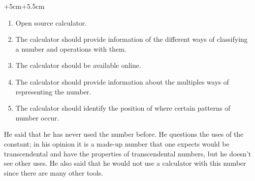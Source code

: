 \documentclass[../main.tex]{subfiles} %
\begin{document}
\begin{changemargin}{+5cm}{+5.5cm}

\begin{enumerate}
   \item Open source calculator.
   \item The calculator should provide information of the different ways of classifying a number and operations with them.
   \item The calculator should be available online.
   \item The calculator should provide information about the multiples ways of representing the number.
   \item The calculator should identify the position of where certain patterns of number occur.
    \newline  
\end{enumerate}



He said that he has never used the number before. He questions the uses of the constant; in his opinion it is a made-up number that one expects would be transcendental and have the properties of transcendental numbers, but he doesn’t see other uses. He also said that he would not use a calculator with this number since there are many other tools. \newline


\end{changemargin}
\end{document}
